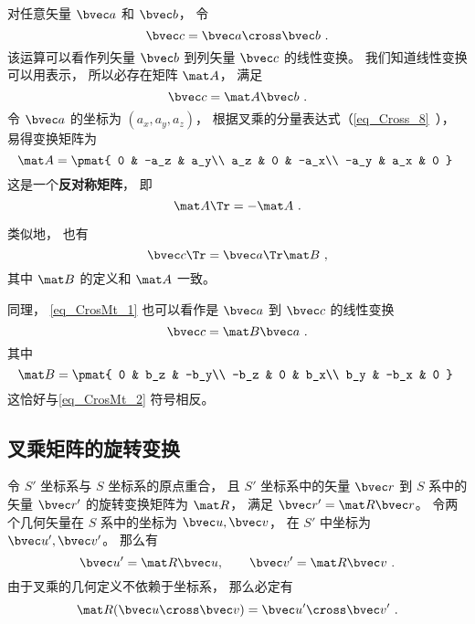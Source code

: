 
对任意矢量 $\bvec a$ 和 $\bvec b$， 令
\begin{equation}\label{eq_CrosMt_1}
\bvec c = \bvec a \cross \bvec b~.
\end{equation}
该运算可以看作列矢量 $\bvec b$ 到列矢量 $\bvec c$ 的线性变换。 我们知道线性变换可以用表示， 所以必存在矩阵 $\mat A$， 满足
\begin{equation}\label{eq_CrosMt_3}
\bvec c = \mat A \bvec b~.
\end{equation}
令 $\bvec a$ 的坐标为 $(a_x, a_y, a_z)$， 根据叉乘的分量表达式（\autoref{eq_Cross_8}~）， 易得变换矩阵为
\begin{equation}\label{eq_CrosMt_2}
\mat A = \pmat{
0 & -a_z & a_y\\
a_z & 0 & -a_x\\
-a_y & a_x & 0
}~\end{equation}
这是一个\textbf{反对称矩阵}， 即
\begin{equation}
\mat A\Tr = -\mat A~.
\end{equation}

类似地， 也有
\begin{equation}
\bvec c\Tr = \bvec a\Tr \mat B~,
\end{equation}
其中 $\mat B$ 的定义和 $\mat A$ 一致。

同理， \autoref{eq_CrosMt_1} 也可以看作是 $\bvec a$ 到 $\bvec c$ 的线性变换
\begin{equation}
\bvec c = \mat B \bvec a~.
\end{equation}
其中
\begin{equation}
\mat B = \pmat{
0 & b_z & -b_y\\
-b_z & 0 & b_x\\
b_y & -b_x & 0
}~
\end{equation}
这恰好与\autoref{eq_CrosMt_2} 符号相反。

\subsection{叉乘矩阵的旋转变换}\label{sub_CrosMt_1}
令 $S'$ 坐标系与 $S$ 坐标系的原点重合， 且 $S'$ 坐标系中的矢量 $\bvec r$ 到 $S$ 系中的矢量 $\bvec r'$ 的旋转变换矩阵为 $\mat R$， 满足 $\bvec r' = \mat R\bvec r$。 令两个几何矢量在 $S$ 系中的坐标为 $\bvec u, \bvec v$， 在 $S'$ 中坐标为 $\bvec u', \bvec v'$。 那么有
\begin{equation}
\bvec u' = \mat R\bvec u, \qquad
\bvec v' = \mat R\bvec v~.
\end{equation}
由于叉乘的几何定义不依赖于坐标系， 那么必定有
\begin{equation}
\mat R(\bvec u\cross \bvec v) = \bvec u'\cross \bvec v'~.
\end{equation}

